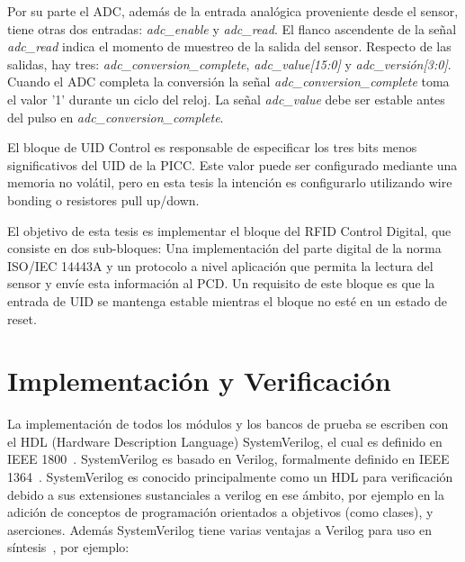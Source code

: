 \documentclass[a4paper, twoside, 11pt]{report}
\begin{document}
Por su parte el ADC, además de la entrada analógica proveniente desde el sensor, tiene otras dos entradas: \textit{adc\_enable} y \textit{adc\_read}. El flanco ascendente de la señal \textit{adc\_read} indica el momento de muestreo de la salida del sensor. Respecto de las salidas, hay tres: \textit{adc\_conversion\_complete}, \textit{adc\_value[15:0]} y \textit{adc\_versión[3:0]}. Cuando el ADC completa la conversión la señal \textit{adc\_conversion\_complete} toma el valor '1' durante un ciclo del reloj. La señal \textit{adc\_value} debe ser estable antes del pulso en \textit{adc\_conversion\_complete}.

El bloque de UID Control es responsable de especificar los tres bits menos significativos del UID de la PICC. Este valor puede ser configurado mediante una memoria no volátil, pero en esta tesis la intención es configurarlo utilizando wire bonding o resistores pull up/down.

El objetivo de esta tesis es implementar el bloque del RFID Control Digital, que consiste en dos sub-bloques: Una implementación del parte digital de la norma ISO/IEC 14443A y un protocolo a nivel aplicación que permita la lectura del sensor y envíe esta información al PCD. Un requisito de este bloque es que la entrada de UID se mantenga estable mientras el bloque no esté en un estado de reset.


\FloatBarrier
\chapter{Implementación y Verificación}

La implementación de todos los módulos y los bancos de prueba se escriben con el HDL (Hardware Description Language) SystemVerilog, el cual  es definido en IEEE 1800~\cite{ieee1800}. SystemVerilog es basado en Verilog,  formalmente definido en IEEE 1364~\cite{ieee1364}. SystemVerilog es conocido principalmente como un HDL para verificación debido a sus extensiones sustanciales a verilog en ese ámbito, por ejemplo en la adición de conceptos de programación orientados a objetivos (como clases), y aserciones. Además SystemVerilog tiene varias ventajas a Verilog para uso en síntesis~\cite{synthesisable_sv}, por ejemplo:
\end{document}
